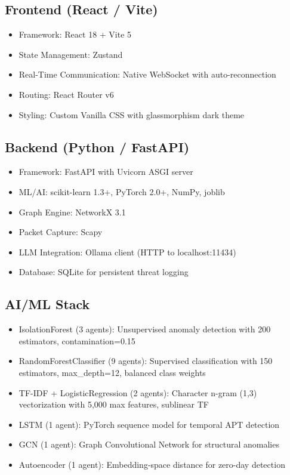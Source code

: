 \documentclass[12pt, a4paper]{report}
\begin{document}
\subsection{Frontend (React / Vite)}
\begin{itemize}
    \item Framework: React 18 + Vite 5
    \item State Management: Zustand
    \item Real-Time Communication: Native WebSocket with auto-reconnection
    \item Routing: React Router v6
    \item Styling: Custom Vanilla CSS with glassmorphism dark theme
\end{itemize}

\subsection{Backend (Python / FastAPI)}
\begin{itemize}
    \item Framework: FastAPI with Uvicorn ASGI server
    \item ML/AI: scikit-learn 1.3+, PyTorch 2.0+, NumPy, joblib
    \item Graph Engine: NetworkX 3.1
    \item Packet Capture: Scapy
    \item LLM Integration: Ollama client (HTTP to localhost:11434)
    \item Database: SQLite for persistent threat logging
\end{itemize}

\subsection{AI/ML Stack}
\begin{itemize}
    \item IsolationForest (3 agents): Unsupervised anomaly detection with 200 estimators, contamination=0.15
    \item RandomForestClassifier (9 agents): Supervised classification with 150 estimators, max\_depth=12, balanced class weights
    \item TF-IDF + LogisticRegression (2 agents): Character n-gram (1,3) vectorization with 5,000 max features, sublinear TF
    \item LSTM (1 agent): PyTorch sequence model for temporal APT detection
    \item GCN (1 agent): Graph Convolutional Network for structural anomalies
    \item Autoencoder (1 agent): Embedding-space distance for zero-day detection
\end{itemize}
\end{document}
